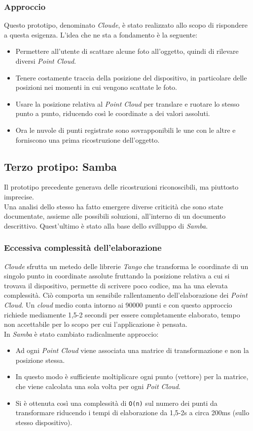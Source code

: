 \subsubsection{Approccio}
Questo prototipo, denominato \emph{Cloude}, è stato realizzato allo scopo di rispondere a questa esigenza. L'idea che ne sta a fondamento è la seguente:
\begin{itemize}
	\item Permettere all'utente di scattare alcune foto all'oggetto, quindi di rilevare diversi \emph{Point Cloud}.
	\item Tenere costamente traccia della posizione del dispositivo, in particolare delle posizioni nei momenti in cui vengono scattate le foto.
	\item Usare la posizione relativa al \emph{Point Cloud} per translare e ruotare lo stesso punto a punto, riducendo così le coordinate a dei valori assoluti.
	\item Ora le nuvole di punti registrate sono sovrapponibili le une con le altre e forniscono una prima ricostruzione dell'oggetto.
\end{itemize}

\subsection{Terzo protipo: Samba}
Il prototipo precedente generava delle ricostruzioni riconoscibili, ma piuttosto imprecise.\\
Una analisi dello stesso ha fatto emergere diverse criticità che sono state documentate, assieme alle possibili soluzioni, all'interno di un documento descrittivo. Quest'ultimo è stato alla base dello svilluppo di \emph{Samba}.
\subsubsection{Eccessiva complessità dell'elaborazione}
\emph{Cloude} sfrutta un metedo delle librerie \emph{Tango} che transforma le coordinate di un singolo punto in coordinate assolute fruttando la posizione relativa a cui si trovava il dispositivo, permette di scrivere poco codice, ma ha una elevata complessità. Ciò comporta un sensibile rallentamento dell'elaborazione dei \emph{Point Cloud}. Un \emph{cloud} medio conta intorno ai 90000 punti e con questo approccio richiede mediamente 1,5-2 secondi per essere completamente elaborato, tempo non accettabile per lo scopo per cui l'applicazione è pensata.\\
In \emph{Samba} è stato cambiato radicalmente approccio:
\begin{itemize}
	\item Ad ogni \emph{Point Cloud} viene associata una matrice di transformazione e non la posizione stessa.
	\item In questo modo è sufficiente moltiplicare ogni punto (vettore) per la matrice, che viene calcolata una sola volta per ogni \emph{Poit Cloud}. 
	\item Si è ottenuta così una complessità di \texttt{O(n)} sul numero dei punti da transformare riducendo i tempi di elaborazione da 1,5-2s a circa 200ms (sullo stesso dispositivo).
\end{itemize}
